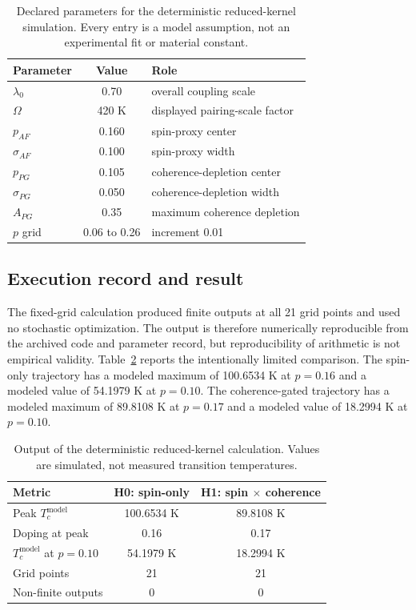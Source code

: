 \documentclass[conference]{IEEEtran}
\begin{document}
\begin{table}[t]
\caption{Declared parameters for the deterministic reduced-kernel simulation. Every entry is a model assumption, not an experimental fit or material constant.}
\label{tab:parameters}
\centering
\small
\begin{tabular}{l c l}
\toprule
Parameter & Value & Role \\
\midrule
$\lambda_0$ & 0.70 & overall coupling scale \\
$\Omega$ & 420 K & displayed pairing-scale factor \\
$p_{AF}$ & 0.160 & spin-proxy center \\
$\sigma_{AF}$ & 0.100 & spin-proxy width \\
$p_{PG}$ & 0.105 & coherence-depletion center \\
$\sigma_{PG}$ & 0.050 & coherence-depletion width \\
$A_{PG}$ & 0.35 & maximum coherence depletion \\
$p$ grid & 0.06 to 0.26 & increment 0.01 \\
\bottomrule
\end{tabular}
\end{table}

\subsection{Execution record and result}

The fixed-grid calculation produced finite outputs at all 21 grid points and used no stochastic optimization. The output is therefore numerically reproducible from the archived code and parameter record, but reproducibility of arithmetic is not empirical validity. Table~\ref{tab:simulationresults} reports the intentionally limited comparison. The spin-only trajectory has a modeled maximum of 100.6534 K at $p=0.16$ and a modeled value of 54.1979 K at $p=0.10$. The coherence-gated trajectory has a modeled maximum of 89.8108 K at $p=0.17$ and a modeled value of 18.2994 K at $p=0.10$.

\begin{table}[t]
\caption{Output of the deterministic reduced-kernel calculation. Values are simulated, not measured transition temperatures.}
\label{tab:simulationresults}
\centering
\small
\begin{tabular}{l c c}
\toprule
Metric & H0: spin-only & H1: spin $\times$ coherence \\
\midrule
Peak $T_c^{\mathrm{model}}$ & 100.6534 K & 89.8108 K \\
Doping at peak & 0.16 & 0.17 \\
$T_c^{\mathrm{model}}$ at $p=0.10$ & 54.1979 K & 18.2994 K \\
Grid points & 21 & 21 \\
Non-finite outputs & 0 & 0 \\
\bottomrule
\end{tabular}
\end{table}
\end{document}
